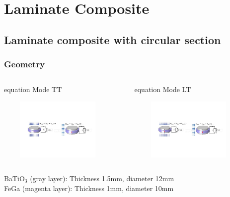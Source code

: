 \documentclass[compress]{beamer}
\begin{document}
\begin{frame}
\begin{columns}[totalwidth=\textwidth]
\begin{column}{.45\textwidth}
	\end{column}
	\end{columns}
\end{frame}

\section{Laminate Composite}
\subsection{Laminate composite with circular section}

\begin{frame}\frametitle{Geometry}
	
\begin{columns}[totalwidth=\textwidth]
   \begin{column}{.49\textwidth}
       \begin{beamercolorbox}[sep=8pt,center]{equation}
      Mode TT 
      \end{beamercolorbox}
\centering \includegraphics[height=3cm,width=0.9\textwidth]{Graphic/03_circuitTT.pdf}
   \end{column}
   \begin{column}{.49\textwidth}
       \begin{beamercolorbox}[sep=8pt,center]{equation}
      Mode LT 
      \end{beamercolorbox}
\centering \includegraphics[height=3cm,width=0.9\textwidth]{Graphic/03_circuitLT.pdf}
   \end{column}
\end{columns}
\centering
{\small
BaTiO$_3$ (gray layer): Thickness 1.5mm, diameter 12mm \\
FeGa (magenta layer): Thickness 1mm, diameter 10mm	
}
\vspace{0.3cm}

\end{frame}
\end{document}
